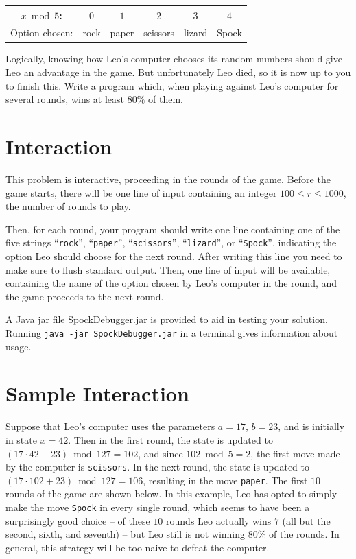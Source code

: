 \begin{center}
\begin{tabular}{|c|c|c|c|c|c|}
\hline
$x \bmod 5$: & $0$ & $1$ & $2$ & $3$ & $4$ \\
\hline
Option chosen: & rock & paper & scissors & lizard & Spock \\
\hline
\end{tabular}
\end{center}

Logically, knowing how Leo's computer chooses its random numbers
should give Leo an advantage in the game.  But unfortunately Leo died,
so it is now up to you to finish this.  Write a program which, when
playing against Leo's computer for several rounds, wins at least
$80\%$ of them.


\section*{Interaction}

This problem is interactive, proceeding in the rounds of the game.
Before the game starts, there will be one line of input containing an
integer $100 \le r \le 1000$, the number of rounds to play.

Then, for each round, your program should write one line containing
one of the five strings ``\texttt{rock}'', ``\texttt{paper}'',
``\texttt{scissors}'', ``\texttt{lizard}'', or ``\texttt{Spock}'',
indicating the option Leo should choose for the next round.  After
writing this line you need to make sure to flush standard output.
Then, one line of input will be available, containing the name of the
option chosen by Leo's computer in the round, and the game proceeds to
the next round.

A Java jar file \href{http://challenge.csc.kth.se/2015/SpockDebugger.jar}{SpockDebugger.jar} is provided to aid in testing your solution. Running
\texttt{java -jar SpockDebugger.jar} in a terminal gives information about usage.

\section*{Sample Interaction}

Suppose that Leo's computer uses the parameters $a = 17$, $b = 23$,
and is initially in state $x = 42$.  Then in the first round, the
state is updated to $(17 \cdot 42 + 23) \bmod 127 = 102$, and since
$102 \bmod 5 = 2$, the first move made by the computer is
\texttt{scissors}.  In the next round, the state is updated to $(17
\cdot 102 + 23) \bmod 127 = 106$, resulting in the move
\texttt{paper}.  The first $10$ rounds of the game are shown below.
In this example, Leo has opted to simply make the move \texttt{Spock}
in every single round, which seems to have been a surprisingly good
choice -- of these $10$ rounds Leo actually wins $7$ (all but the
second, sixth, and seventh) -- but Leo still is not winning $80\%$ of
the rounds.  In general, this strategy will be too naive to defeat
the computer.

